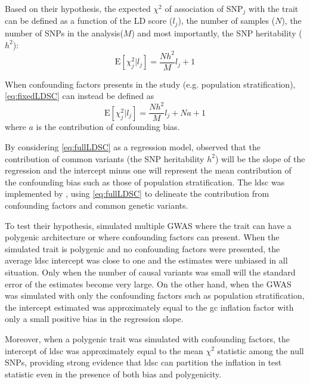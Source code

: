 	Based on their hypothesis, the expected $\chi^2$ of association of \gls{SNP}$_j$ with the trait can be defined as a function of the \gls{LD} score ($l_j$), the number of samples ($N$), the number of \glspl{SNP} in the analysis($M$) and most importantly, the \gls{SNP} heritability ($h^2$):
	\begin{equation}
	\mathrm{E}[\chi^2_j | l_j] = \frac{Nh^2}{M}l_j+1
	\label{eq:fixedLDSC}
	\end{equation}
	
	When confounding factors presents in the study (e.g. population stratification), \cref{eq:fixedLDSC} can instead be defined as
	\begin{equation}
	\mathrm{E}[\chi^2_j | l_j] = \frac{Nh^2}{M}l_j+Na+1
	\label{eq:fullLDSC}
	\end{equation}
	where $a$ is the contribution of confounding bias.
	
	By considering \cref{eq:fullLDSC} as a regression model, \citet{Bulik-Sullivan2015} observed that the contribution of common variants (the \gls{SNP} heritability $h^2$) will be the slope of the regression and the intercept minus one will represent the mean contribution of the confounding bias such as those of population stratification. 
	The \gls{ldsc} was implemented by \citet{Bulik-Sullivan2015}, using \cref{eq:fullLDSC} to delineate the contribution from confounding factors and common genetic variants.
	
	To test their hypothesis, \citet{Bulik-Sullivan2015} simulated multiple \gls{GWAS} where the trait can have a polygenic architecture or where confounding factors can present.
	When the simulated trait is polygenic and no confounding factors were presented, the average \gls{ldsc} intercept was close to one and the estimates were unbiased in all situation.
	Only when the number of causal variants was small will the standard error of the estimates become very large.
	On the other hand, when the \gls{GWAS} was simulated with only the confounding factors such as population stratification, the intercept estimated was approximately equal to the \gls{gc} inflation factor with only a small positive bias in the regression slope.
	
	Moreover, when a polygenic trait was simulated with confounding factors, the intercept of \gls{ldsc} was approximately equal to the mean $\chi^2$ statistic among the null \glspl{SNP}, providing strong evidence that \gls{ldsc} can partition the inflation in test statistic even in the presence of both bias and polygenicity.
	
